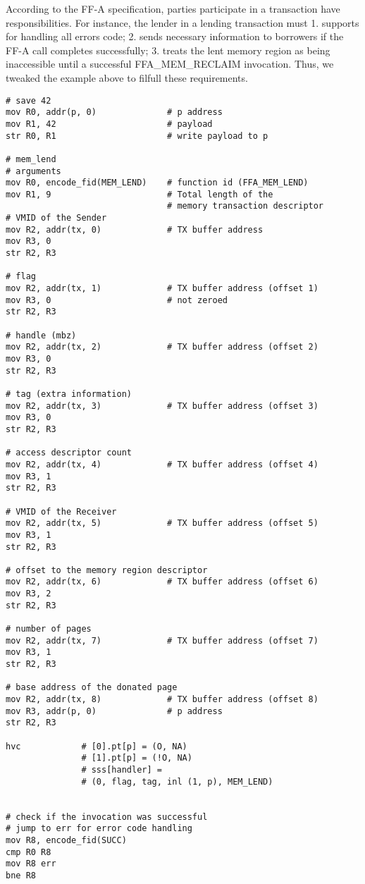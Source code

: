 \documentclass{article}
\begin{document}
\clearpage
According to the FF-A specification, parties participate in a transaction have responsibilities. For instance, the lender in a lending transaction must 1. supports for handling all errors code; 2. sends necessary information to borrowers if the FF-A call completes successfully; 3. treats the lent memory region as being inaccessible until a successful FFA\_MEM\_RECLAIM invocation. Thus, we tweaked the example above to filfull these requirements.
\begin{lstlisting}[caption={VM 0}]
# save 42
mov R0, addr(p, 0)              # p address
mov R1, 42                      # payload
str R0, R1                      # write payload to p

# mem_lend
# arguments
mov R0, encode_fid(MEM_LEND)    # function id (FFA_MEM_LEND)
mov R1, 9                       # Total length of the
                                # memory transaction descriptor
# VMID of the Sender
mov R2, addr(tx, 0)             # TX buffer address
mov R3, 0
str R2, R3

# flag
mov R2, addr(tx, 1)             # TX buffer address (offset 1)
mov R3, 0                       # not zeroed
str R2, R3

# handle (mbz)
mov R2, addr(tx, 2)             # TX buffer address (offset 2)
mov R3, 0
str R2, R3

# tag (extra information)
mov R2, addr(tx, 3)             # TX buffer address (offset 3)
mov R3, 0
str R2, R3

# access descriptor count
mov R2, addr(tx, 4)             # TX buffer address (offset 4)
mov R3, 1
str R2, R3

# VMID of the Receiver
mov R2, addr(tx, 5)             # TX buffer address (offset 5)
mov R3, 1
str R2, R3

# offset to the memory region descriptor
mov R2, addr(tx, 6)             # TX buffer address (offset 6)
mov R3, 2
str R2, R3

# number of pages
mov R2, addr(tx, 7)             # TX buffer address (offset 7)
mov R3, 1
str R2, R3

# base address of the donated page
mov R2, addr(tx, 8)             # TX buffer address (offset 8)
mov R3, addr(p, 0)              # p address
str R2, R3

hvc            # [0].pt[p] = (O, NA)
               # [1].pt[p] = (!O, NA)
               # sss[handler] =
               # (0, flag, tag, inl (1, p), MEM_LEND)


# check if the invocation was successful
# jump to err for error code handling
mov R8, encode_fid(SUCC)
cmp R0 R8
mov R8 err
bne R8


\end{lstlisting}
\end{document}
